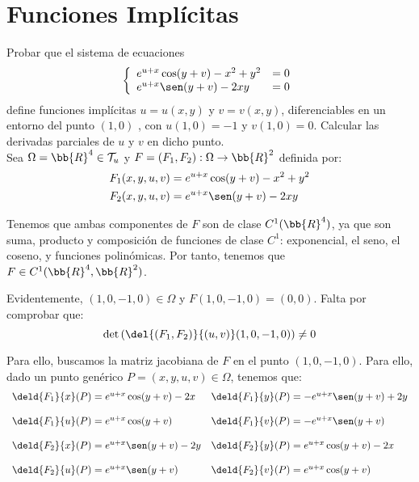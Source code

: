 \section{Funciones Implícitas}

\begin{ejercicio}
    Probar que el sistema de ecuaciones
    \begin{equation*}
        \left\{
            \begin{array}{ll}
                e^{u+x} \cos(y+v) - x^2+y^2 &= 0 \\
                e^{u+x} \sen(y+v) - 2xy &= 0
            \end{array}
        \right.
    \end{equation*}
    define funciones implícitas $u = u(x, y)$ y $v = v(x, y)$, diferenciables en un entorno
    del punto $(1, 0)$ , con $u(1, 0)=-1$ y $v(1, 0) = 0$. Calcular las derivadas parciales
    de $u$ y $v$ en dicho punto.\\

    Sea $\Omega = \bb{R}^4\in \mathcal{T}_u$ y $F=(F_1,F_2):\Omega \to \bb{R}^2$ definida por:
    \begin{align*}
        F_1(x,y,u,v) &= e^{u+x} \cos(y+v) - x^2+y^2 \\
        F_2(x,y,u,v) &= e^{u+x} \sen(y+v) - 2xy
    \end{align*}

    Tenemos que ambas componentes de $F$ son de clase $C^1(\bb{R}^4)$,
    ya que son suma, producto y composición de funciones de clase $C^1$: exponencial, el seno, el coseno, y funciones polinómicas.
    Por tanto, tenemos que $F\in C^1(\bb{R}^4,\bb{R}^2)$.

    Evidentemente, $(1,0,-1,0)\in \Omega$ y $F(1,0,-1,0)=(0,0)$. Falta por comprobar que:
    \begin{equation*}
        \det \left( \del{(F_1,F_2)}{(u,v)}(1,0,-1,0) \right) \neq 0
    \end{equation*}

    Para ello, buscamos la matriz jacobiana de $F$ en el punto $(1,0,-1,0)$. Para ello, dado un punto
    genérico $P=(x,y,u,v)\in \Omega$, tenemos que:
    \begin{equation*}
        \begin{array}{ll}
            \deld{F_1}{x}(P) = e^{u+x} \cos(y+v) - 2x & \deld{F_1}{y}(P) = -e^{u+x} \sen(y+v) + 2y \\ \\
            \deld{F_1}{u}(P) = e^{u+x} \cos(y+v) & \deld{F_1}{v}(P) = -e^{u+x} \sen(y+v) \\ \\
            \deld{F_2}{x}(P) = e^{u+x} \sen(y+v) - 2y & \deld{F_2}{y}(P) = e^{u+x} \cos(y+v) - 2x \\ \\
            \deld{F_2}{u}(P) = e^{u+x} \sen(y+v) & \deld{F_2}{v}(P) = e^{u+x} \cos(y+v)
        \end{array}
    \end{equation*}


\end{ejercicio}
